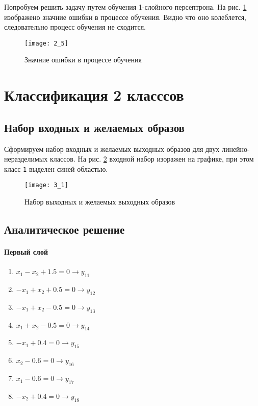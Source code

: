 Попробуем решить задачу путем обучения 1-слойного персептрона. На рис. \ref{fig:2_5} изображено значние ошибки в процессе обучения. Видно что оно колеблется, следовательно процесс обучения не сходится.

\begin{figure}[H]
\begin{center}
	\texttt{[image: 2\_5]}
	\caption{Значние ошибки в процессе обучения}
	\label{fig:2_5}
\end{center}
\end{figure}

\section{Классификация 2 класссов}

\subsection{Набор входных и желаемых образов}

Сформируем набор входных и желаемых выходных образов для двух линейно-неразделимых классов. На рис. \ref{fig:3_1} входной набор изоражен на графике, при этом класс \verb+1+ выделен синей областью.

\begin{figure}[H]
\begin{center}
	\texttt{[image: 3\_1]}
	\caption{Набор выходных и желаемых выходных образов}
	\label{fig:3_1}
\end{center}
\end{figure}

\subsection{Аналитическое решение}


\paragraph{Первый слой}
\begin{enumerate}
	\item $x_1 - x_2 + 1.5 = 0 \rightarrow y_{11}$
	\item $-x_1 + x_2 + 0.5 = 0 \rightarrow y_{12}$
	\item $-x_1 + x_2 - 0.5 = 0 \rightarrow y_{13}$
	\item $x_1 + x_2 - 0.5 = 0 \rightarrow y_{14}$
	\item $-x_1 + 0.4 = 0 \rightarrow y_{15}$
	\item $x_2 - 0.6 = 0 \rightarrow y_{16}$
	\item $x_1 - 0.6 = 0 \rightarrow y_{17}$
	\item $-x_2 + 0.4 = 0 \rightarrow y_{18}$
\end{enumerate}

